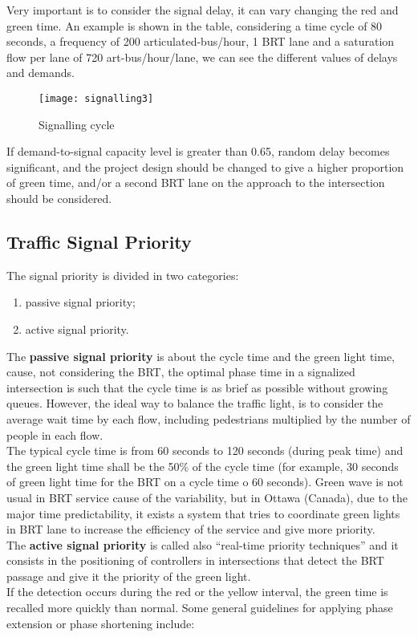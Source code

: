 \documentclass{article}
\begin{document}
Very important is to consider the signal delay, it can vary changing the red and green time. 
An example is shown in the table, considering a time cycle of 80 seconds, a frequency of 200 articulated-bus/hour, 1 BRT lane and a saturation flow per lane of 720 art-bus/hour/lane, we can see the different values of delays and demands. 
\begin{figure}[H]
\centering
\texttt{[image: signalling3]}
\caption{Signalling cycle}
\end{figure}
If demand-to-signal capacity level is greater than 0.65, random delay becomes significant, and the project design should be changed to give a higher proportion of green time, and/or a second BRT lane on the approach to the intersection should be considered.
\subsection{Traffic Signal Priority}
The signal priority is divided in two categories: 
\begin{enumerate}
\item passive signal priority;
\item active signal priority.
\end{enumerate}
The \textbf{passive signal priority} is about the cycle time and the green light time, cause, not considering the BRT, the optimal phase time in a signalized intersection is such that the cycle time is as brief as possible without growing queues. 
However, the ideal way to balance the traffic light, is to consider the average wait time by each flow, including pedestrians multiplied by the number of people in each flow.\\
The typical cycle time is from 60 seconds to 120 seconds (during peak time) and the green light time shall be the 50\% of the cycle time (for example, 30 seconds of green light time for the BRT on a cycle time o 60 seconds). 
Green wave is not usual in BRT service cause of the variability, but in Ottawa (Canada), due to the major time predictability, it exists a system that tries to coordinate green lights in BRT lane to increase the efficiency of the service and give more priority.\\
The \textbf{active signal priority} is called also “real-time priority techniques” and it consists in the positioning of controllers in intersections that detect the BRT passage and give it the priority of the green light.\\
If the detection occurs during the red or the yellow interval, the green time is recalled more quickly than normal. Some general guidelines for applying phase extension or phase shortening include: 
\end{document}
